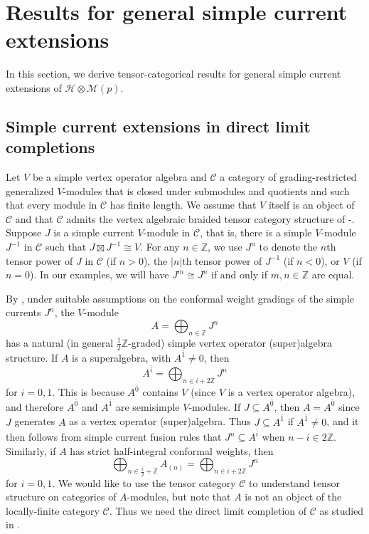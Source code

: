\documentclass[11pt, reqno]{amsart}
\theoremstyle{definition}\newtheorem{defi}[thm]{Definition}
\theoremstyle{definition}\newtheorem{rem}[thm]{Remark}
\theoremstyle{definition}\newtheorem{exam}[thm]{Example}
\theoremstyle{definition}\newtheorem{assum}[thm]{Assumption}
\newcommand{\cH}{\mathcal{H}}
\newcommand{\cM}{\mathcal{M}}
\newcommand{\cC}{\mathcal{C}}
\newcommand{\ZZ}{\mathbb{Z}}
\newcommand{\tens}{\boxtimes}
\newcommand{\even}{\overline{0}}
\newcommand{\odd}{\overline{1}}
\begin{document}
\section{Results for general simple current extensions}\label{sec:main_results}

In this section, we derive tensor-categorical results for general simple current extensions of $\cH\otimes\cM(p)$. 



\subsection{Simple current extensions in direct limit completions}


Let $V$ be a simple vertex operator algebra and $\cC$ a category of grading-restricted generalized $V$-modules that is closed under submodules and quotients and such that every module in $\cC$ has finite length. We assume that $V$ itself is an object of $\cC$ and that $\cC$ admits the vertex algebraic braided tensor category structure of \cite{HLZ1}-\cite{HLZ8}. Suppose $J$ is a simple current $V$-module in $\cC$, that is, there is a simple $V$-module $J^{-1}$ in $\cC$ such that $J\tens J^{-1}\cong V$. For any $n\in\ZZ$, we use $J^n$ to denote the $n$th tensor power of $J$ in $\cC$ (if $n>0$), the $\vert n\vert$th tensor power of $J^{-1}$ (if $n<0$), or $V$ (if $n=0$). In our examples, we will have $J^m\cong J^n$ if and only if $m,n\in\ZZ$ are equal.

By \cite[Theorem 3.12]{CKL}, under suitable assumptions on the conformal weight gradings of the simple currents $J^n$, the $V$-module
\begin{equation*}
A=\bigoplus_{n\in\ZZ} J^n
\end{equation*}
has a natural (in general $\frac{1}{2}\ZZ$-graded) simple vertex operator (super)algebra structure. If $A$ is a superalgebra, with $A^{\odd}\neq 0$, then
\begin{equation}\label{eqn:A_parity}
A^{\overline{i}} =\bigoplus_{n\in i+2\ZZ} J^n
\end{equation}
for $i =0,1$. This is because $A^{\even}$ contains $V$ (since $V$ is a vertex operator algebra), and therefore $A^{\even}$ and $A^{\odd}$ are semisimple $V$-modules. If $J\subseteq A^{\even}$, then $A=A^{\even}$ since $J$ generates $A$ as a vertex operator (super)algebra. Thus $J\subseteq A^{\odd}$ if $A^{\odd}\neq 0$, and it then follows from simple current fusion rules that $J^n\subseteq A^{\overline{i}}$ when $n-i\in2\ZZ$. Similarly, if $A$ has strict half-integral conformal weights, then
\begin{equation}\label{eqn:A_conf_wts}
\bigoplus_{n\in\frac{i}{2}+\ZZ} A_{(n)} = \bigoplus_{n\in i+2\ZZ} J^n
\end{equation}
for $i=0,1$. We would like to use the tensor category $\cC$ to understand tensor structure on categories of $A$-modules, but note that $A$ is not an object of the locally-finite category $\cC$. Thus we need the direct limit completion of $\cC$ as studied in \cite{CMY-completions}.
\end{document}
